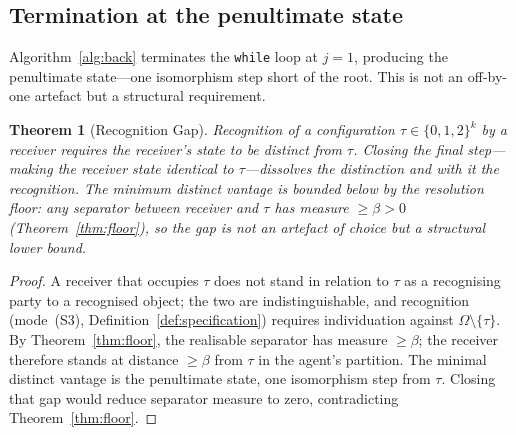 \documentclass[twocolumn,10pt,a4paper]{article}
\theoremstyle{thmstyle}
\newtheorem{theorem}{Theorem}[section]
\theoremstyle{definition}
\theoremstyle{remark}
\begin{document}
\subsection{Termination at the penultimate state}

Algorithm~\ref{alg:back} terminates the \texttt{while} loop at $j=1$,
producing the penultimate state---one isomorphism step short of the
root. This is not an off-by-one artefact but a structural requirement.

\begin{theorem}[Recognition Gap]
\label{thm:recog}
Recognition of a configuration $\tau\in\{0,1,2\}^{k}$ by a receiver
requires the receiver's state to be distinct from $\tau$. Closing the
final step---making the receiver state identical to $\tau$---dissolves
the distinction and with it the recognition. The minimum distinct
vantage is bounded below by the resolution floor: any separator
between receiver and $\tau$ has measure $\geq\beta>0$
(Theorem~\ref{thm:floor}), so the gap is not an artefact of choice
but a structural lower bound.
\end{theorem}

\begin{proof}
A receiver that occupies $\tau$ does not stand in relation to $\tau$
as a recognising party to a recognised object; the two are
indistinguishable, and recognition (mode~(S3),
Definition~\ref{def:specification}) requires individuation against
$\Omega\setminus\{\tau\}$. By Theorem~\ref{thm:floor}, the realisable
separator has measure $\geq\beta$; the receiver therefore stands at
distance $\geq\beta$ from $\tau$ in the agent's partition. The
minimal distinct vantage is the penultimate state, one isomorphism
step from $\tau$. Closing that gap would reduce separator measure to
zero, contradicting Theorem~\ref{thm:floor}.
\end{proof}
\end{document}
